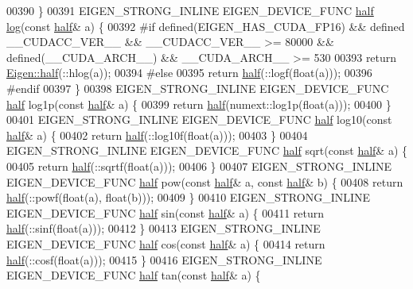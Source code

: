 \begin{DoxyCode}
00390 \}
00391 EIGEN\_STRONG\_INLINE EIGEN\_DEVICE\_FUNC \hyperlink{struct_eigen_1_1half}{half} \hyperlink{structlog}{log}(\textcolor{keyword}{const} \hyperlink{struct_eigen_1_1half}{half}& a) \{
00392 \textcolor{preprocessor}{#if defined(EIGEN\_HAS\_CUDA\_FP16) && defined \_\_CUDACC\_VER\_\_ && \_\_CUDACC\_VER\_\_ >= 80000 &&
       defined(\_\_CUDA\_ARCH\_\_) && \_\_CUDA\_ARCH\_\_ >= 530}
00393   \textcolor{keywordflow}{return} \hyperlink{struct_eigen_1_1half}{Eigen::half}(::hlog(a));
00394 \textcolor{preprocessor}{#else}
00395   \textcolor{keywordflow}{return} \hyperlink{struct_eigen_1_1half}{half}(::logf(\textcolor{keywordtype}{float}(a)));
00396 \textcolor{preprocessor}{#endif}
00397 \}
00398 EIGEN\_STRONG\_INLINE EIGEN\_DEVICE\_FUNC \hyperlink{struct_eigen_1_1half}{half} log1p(\textcolor{keyword}{const} \hyperlink{struct_eigen_1_1half}{half}& a) \{
00399   \textcolor{keywordflow}{return} \hyperlink{struct_eigen_1_1half}{half}(numext::log1p(\textcolor{keywordtype}{float}(a)));
00400 \}
00401 EIGEN\_STRONG\_INLINE EIGEN\_DEVICE\_FUNC \hyperlink{struct_eigen_1_1half}{half} log10(\textcolor{keyword}{const} \hyperlink{struct_eigen_1_1half}{half}& a) \{
00402   \textcolor{keywordflow}{return} \hyperlink{struct_eigen_1_1half}{half}(::log10f(\textcolor{keywordtype}{float}(a)));
00403 \}
00404 EIGEN\_STRONG\_INLINE EIGEN\_DEVICE\_FUNC \hyperlink{struct_eigen_1_1half}{half} sqrt(\textcolor{keyword}{const} \hyperlink{struct_eigen_1_1half}{half}& a) \{
00405   \textcolor{keywordflow}{return} \hyperlink{struct_eigen_1_1half}{half}(::sqrtf(\textcolor{keywordtype}{float}(a)));
00406 \}
00407 EIGEN\_STRONG\_INLINE EIGEN\_DEVICE\_FUNC \hyperlink{struct_eigen_1_1half}{half} pow(\textcolor{keyword}{const} \hyperlink{struct_eigen_1_1half}{half}& a, \textcolor{keyword}{const} \hyperlink{struct_eigen_1_1half}{half}& b) \{
00408   \textcolor{keywordflow}{return} \hyperlink{struct_eigen_1_1half}{half}(::powf(\textcolor{keywordtype}{float}(a), \textcolor{keywordtype}{float}(b)));
00409 \}
00410 EIGEN\_STRONG\_INLINE EIGEN\_DEVICE\_FUNC \hyperlink{struct_eigen_1_1half}{half} sin(\textcolor{keyword}{const} \hyperlink{struct_eigen_1_1half}{half}& a) \{
00411   \textcolor{keywordflow}{return} \hyperlink{struct_eigen_1_1half}{half}(::sinf(\textcolor{keywordtype}{float}(a)));
00412 \}
00413 EIGEN\_STRONG\_INLINE EIGEN\_DEVICE\_FUNC \hyperlink{struct_eigen_1_1half}{half} cos(\textcolor{keyword}{const} \hyperlink{struct_eigen_1_1half}{half}& a) \{
00414   \textcolor{keywordflow}{return} \hyperlink{struct_eigen_1_1half}{half}(::cosf(\textcolor{keywordtype}{float}(a)));
00415 \}
00416 EIGEN\_STRONG\_INLINE EIGEN\_DEVICE\_FUNC \hyperlink{struct_eigen_1_1half}{half} tan(\textcolor{keyword}{const} \hyperlink{struct_eigen_1_1half}{half}& a) \{

\end{DoxyCode}
